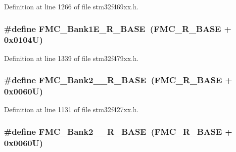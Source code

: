 Definition at line 1266 of file stm32f469xx.\+h.

\subsubsection[{\texorpdfstring{F\+M\+C\+\_\+\+Bank1\+E\+\_\+\+R\+\_\+\+B\+A\+SE}{FMC_Bank1E_R_BASE}}]{\setlength{\rightskip}{0pt plus 5cm}\#define F\+M\+C\+\_\+\+Bank1\+E\+\_\+\+R\+\_\+\+B\+A\+SE~({\bf F\+M\+C\+\_\+\+R\+\_\+\+B\+A\+SE} + 0x0104\+U)}\hypertarget{group___peripheral__memory__map_gad82d3a6bac014fa645fb67a63fae4bc0}{}\label{group___peripheral__memory__map_gad82d3a6bac014fa645fb67a63fae4bc0}


Definition at line 1339 of file stm32f479xx.\+h.

\subsubsection[{\texorpdfstring{F\+M\+C\+\_\+\+Bank2\+\_\+3\+\_\+\+R\+\_\+\+B\+A\+SE}{FMC_Bank2_3_R_BASE}}]{\setlength{\rightskip}{0pt plus 5cm}\#define F\+M\+C\+\_\+\+Bank2\+\_\+\_\+\+R\+\_\+\+B\+A\+SE~({\bf F\+M\+C\+\_\+\+R\+\_\+\+B\+A\+SE} + 0x0060\+U)}\hypertarget{group___peripheral__memory__map_ga48c2af45e9b49fa719236a2e71d2f8b2}{}\label{group___peripheral__memory__map_ga48c2af45e9b49fa719236a2e71d2f8b2}


Definition at line 1131 of file stm32f427xx.\+h.

\subsubsection[{\texorpdfstring{F\+M\+C\+\_\+\+Bank2\+\_\+3\+\_\+\+R\+\_\+\+B\+A\+SE}{FMC_Bank2_3_R_BASE}}]{\setlength{\rightskip}{0pt plus 5cm}\#define F\+M\+C\+\_\+\+Bank2\+\_\+\_\+\+R\+\_\+\+B\+A\+SE~({\bf F\+M\+C\+\_\+\+R\+\_\+\+B\+A\+SE} + 0x0060\+U)}\hypertarget{group___peripheral__memory__map_ga48c2af45e9b49fa719236a2e71d2f8b2}{}\label{group___peripheral__memory__map_ga48c2af45e9b49fa719236a2e71d2f8b2}


